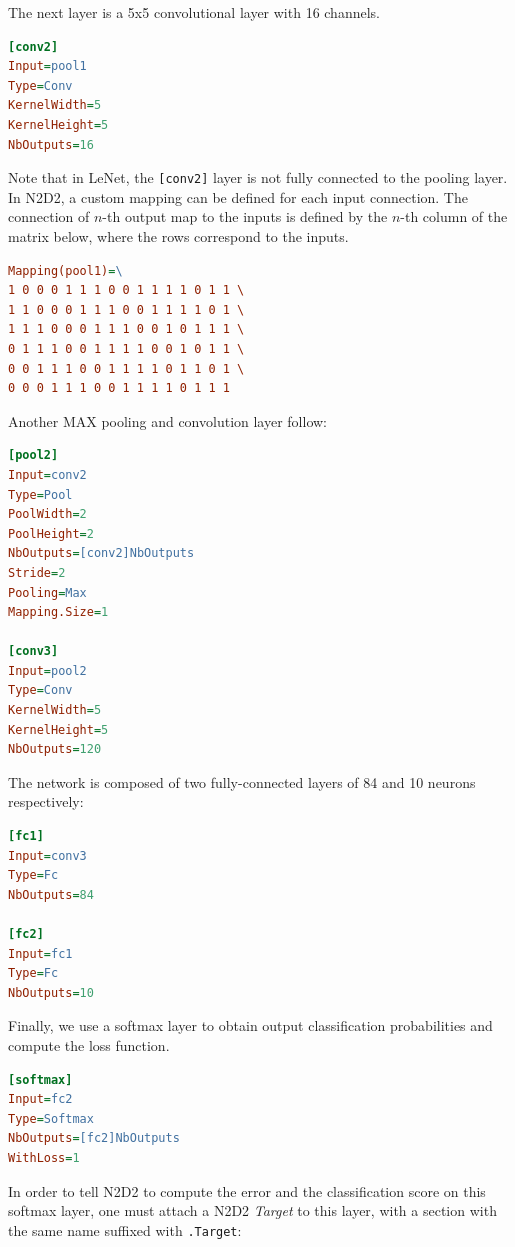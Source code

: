 \documentclass[a4paper,11pt,oneside]{article}
\begin{document}
The next layer is a 5x5 convolutional layer with 16 channels.

\begin{lstlisting}[language=ini]
[conv2]
Input=pool1
Type=Conv
KernelWidth=5
KernelHeight=5
NbOutputs=16
\end{lstlisting}

Note that in LeNet, the \lstinline![conv2]! layer is not fully connected to the
pooling layer. In N2D2, a custom mapping can be defined for each input
connection. The connection of $n$-th output map to the inputs is defined by the
$n$-th column of the matrix below, where the rows correspond to the inputs.

\begin{lstlisting}[language=ini]
Mapping(pool1)=\
1 0 0 0 1 1 1 0 0 1 1 1 1 0 1 1 \
1 1 0 0 0 1 1 1 0 0 1 1 1 1 0 1 \
1 1 1 0 0 0 1 1 1 0 0 1 0 1 1 1 \
0 1 1 1 0 0 1 1 1 1 0 0 1 0 1 1 \
0 0 1 1 1 0 0 1 1 1 1 0 1 1 0 1 \
0 0 0 1 1 1 0 0 1 1 1 1 0 1 1 1
\end{lstlisting}

Another MAX pooling and convolution layer follow:

\begin{lstlisting}[language=ini]
[pool2]
Input=conv2
Type=Pool
PoolWidth=2
PoolHeight=2
NbOutputs=[conv2]NbOutputs
Stride=2
Pooling=Max
Mapping.Size=1

[conv3]
Input=pool2
Type=Conv
KernelWidth=5
KernelHeight=5
NbOutputs=120
\end{lstlisting}

The network is composed of two fully-connected layers of 84 and 10 neurons
respectively:

\begin{lstlisting}[language=ini]
[fc1]
Input=conv3
Type=Fc
NbOutputs=84

[fc2]
Input=fc1
Type=Fc
NbOutputs=10
\end{lstlisting}

Finally, we use a softmax layer to obtain output classification probabilities
and compute the loss function.

\begin{lstlisting}[language=ini]
[softmax]
Input=fc2
Type=Softmax
NbOutputs=[fc2]NbOutputs
WithLoss=1
\end{lstlisting}

In order to tell N2D2 to compute the error and the classification score on this
softmax layer, one must attach a N2D2 \emph{Target} to this layer, with a
section with the same name suffixed with \lstinline!.Target!:
\end{document}
